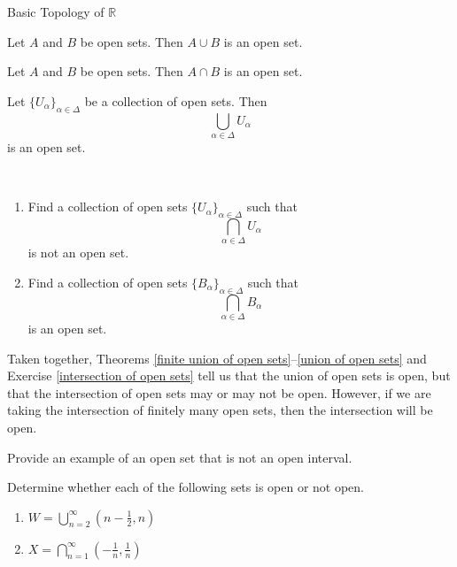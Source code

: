 \begin{section}{Basic Topology of $\mathbb{R}$}
\begin{theorem}[*]\label{finite union of open sets}
Let $A$ and $B$ be open sets.  Then $A\cup B$ is an open set. 
\end{theorem}

\begin{theorem}[*]\label{finite intersection of open sets}
Let $A$ and $B$ be open sets.  Then $A\cap B$ is an open set.
\end{theorem}

\begin{theorem}[*]\label{union of open sets}
Let $\{U_{\alpha}\}_{\alpha\in\Delta}$ be a collection of open sets.  Then
\[
\bigcup_{\alpha\in\Delta} U_{\alpha}
\]
is an open set.
\end{theorem}

\begin{exercise}\label{intersection of open sets}\
\begin{enumerate}
\item Find a collection of open sets $\{U_{\alpha}\}_{\alpha\in\Delta}$ such that
\[
\bigcap_{\alpha\in\Delta} U_{\alpha}
\]
is not an open set.
\item Find a collection of open sets $\{B_{\alpha}\}_{\alpha\in\Delta}$ such that
\[
\bigcap_{\alpha\in\Delta} B_{\alpha}
\]
is an open set.
\end{enumerate}
\end{exercise}

\begin{remark}\label{union vs intersection of open sets}
Taken together, Theorems \ref{finite union of open sets}--\ref{union of open sets} and Exercise \ref{intersection of open sets} tell us that the union of open sets is open, but that the intersection of open sets may or may not be open.  However, if we are taking the intersection of finitely many open sets, then the intersection will be open.
\end{remark}

\begin{exercise}
Provide an example of an open set that is not an open interval.
\end{exercise}

\begin{exercise}
Determine whether each of the following sets is open or not open.
\begin{enumerate}
\item $\displaystyle W=\bigcup_{n=2}^{\infty} \left(n - \frac{1}{2},n\right)$
\item $\displaystyle X=\bigcap_{n=1}^{\infty} \left(-\frac{1}{n}, \frac{1}{n}\right)$
\end{enumerate}
\end{exercise}


\end{section}
